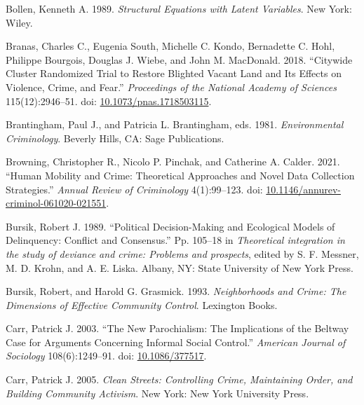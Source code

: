\documentclass [11pt, proquest] {uwthesis}[2015/03/03]
\newlength{\cslhangindent}
\newenvironment{CSLReferences}[2]%
{\setlength{\parindent}{0pt}%
\everypar{\setlength{\hangindent}{\cslhangindent}}\ignorespaces}%
{\par}
\begin{document}
\begin{CSLReferences}{1}{0}
\leavevmode\hypertarget{ref-bollenStructuralEquationsLatent1989}{}%
Bollen, Kenneth A. 1989. \emph{Structural Equations with Latent Variables}. {New York}: {Wiley}.

\leavevmode\hypertarget{ref-branasCitywideClusterRandomized2018}{}%
Branas, Charles C., Eugenia South, Michelle C. Kondo, Bernadette C. Hohl, Philippe Bourgois, Douglas J. Wiebe, and John M. MacDonald. 2018. {``Citywide {Cluster Randomized Trial} to {Restore Blighted Vacant Land} and Its {Effects} on {Violence}, {Crime}, and {Fear}.''} \emph{Proceedings of the National Academy of Sciences} 115(12):2946--51. doi: \href{https://doi.org/10.1073/pnas.1718503115}{10.1073/pnas.1718503115}.

\leavevmode\hypertarget{ref-brantinghamEnvironmentalCriminology1981}{}%
Brantingham, Paul J., and Patricia L. Brantingham, eds. 1981. \emph{Environmental {Criminology}}. {Beverly Hills, CA}: {Sage Publications}.

\leavevmode\hypertarget{ref-browningHumanMobilityCrime2021}{}%
Browning, Christopher R., Nicolo P. Pinchak, and Catherine A. Calder. 2021. {``Human {Mobility} and {Crime}: {Theoretical Approaches} and {Novel Data Collection Strategies}.''} \emph{Annual Review of Criminology} 4(1):99--123. doi: \href{https://doi.org/10.1146/annurev-criminol-061020-021551}{10.1146/annurev-criminol-061020-021551}.

\leavevmode\hypertarget{ref-bursikPoliticalDecisionmakingEcological1989}{}%
Bursik, Robert J. 1989. {``Political Decision-Making and Ecological Models of Delinquency: {Conflict} and Consensus.''} Pp. 105--18 in \emph{Theoretical integration in the study of deviance and crime: {Problems} and prospects}, edited by S. F. Messner, M. D. Krohn, and A. E. Liska. {Albany, NY}: {State University of New York Press}.

\leavevmode\hypertarget{ref-bursikNeighborhoodsCrimeDimensions1993}{}%
Bursik, Robert, and Harold G. Grasmick. 1993. \emph{Neighborhoods and {Crime}: {The Dimensions} of {Effective Community Control}}. {Lexington Books}.

\leavevmode\hypertarget{ref-carrNewParochialismImplications2003}{}%
Carr, Patrick J. 2003. {``The {New Parochialism}: {The Implications} of the {Beltway Case} for {Arguments Concerning Informal Social Control}.''} \emph{American Journal of Sociology} 108(6):1249--91. doi: \href{https://doi.org/10.1086/377517}{10.1086/377517}.

\leavevmode\hypertarget{ref-carrCleanStreetsControlling2005}{}%
Carr, Patrick J. 2005. \emph{Clean {Streets}: {Controlling Crime}, {Maintaining Order}, and {Building Community Activism}}. {New York}: {New York University Press}.


\end{CSLReferences}
\end{document}
